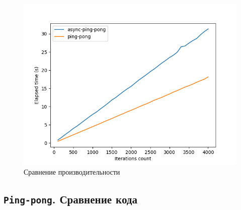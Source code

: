 \documentclass[t]{beamer}  %
\begin{document}
 \begin{frame}[fragile]
	\frametitle{\insertsection} 
	\framesubtitle{\insertsubsection}
	\vspace{-0.4cm}
	\begin{figure}
		\includegraphics[width=0.8\linewidth]{images/async-ping-pong}
		\caption*{Сравнение производительности}
	\end{figure}
 \end{frame}

 \subsection{\texttt{Ping-pong}. Сравнение кода}
\end{document}
